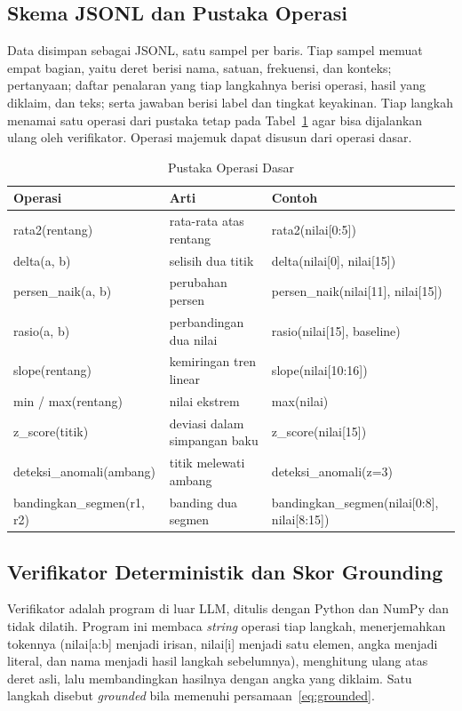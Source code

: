 \documentclass[10pt,a4paper,twocolumn]{article}
\begin{document}
\subsection{Skema JSONL dan Pustaka Operasi}
Data disimpan sebagai JSONL, satu sampel per baris. Tiap sampel memuat empat
bagian, yaitu deret berisi nama, satuan, frekuensi, dan konteks; pertanyaan;
daftar penalaran yang tiap langkahnya berisi operasi, hasil yang diklaim, dan
teks; serta jawaban berisi label dan tingkat keyakinan. Tiap langkah menamai
satu operasi dari pustaka tetap pada Tabel~\ref{tab:operasi} agar bisa
dijalankan ulang oleh verifikator. Operasi majemuk dapat disusun dari operasi
dasar.

\begin{table}[t]
\centering
\caption{Pustaka Operasi Dasar}
\label{tab:operasi}
\footnotesize
\begin{tabular}{@{}p{2.3cm}p{2.3cm}p{2.6cm}@{}}
\toprule
\textbf{Operasi} & \textbf{Arti} & \textbf{Contoh} \\
\midrule
rata2(rentang) & rata-rata atas rentang & rata2(nilai[0:5]) \\
delta(a, b) & selisih dua titik & delta(nilai[0], nilai[15]) \\
persen\_naik(a, b) & perubahan persen & persen\_naik(nilai[11], nilai[15]) \\
rasio(a, b) & perbandingan dua nilai & rasio(nilai[15], baseline) \\
slope(rentang) & kemiringan tren linear & slope(nilai[10:16]) \\
min / max(rentang) & nilai ekstrem & max(nilai) \\
z\_score(titik) & deviasi dalam simpangan baku & z\_score(nilai[15]) \\
deteksi\_anomali(ambang) & titik melewati ambang & deteksi\_anomali(z=3) \\
bandingkan\_segmen(r1, r2) & banding dua segmen & bandingkan\_segmen(nilai[0:8], nilai[8:15]) \\
\bottomrule
\end{tabular}
\end{table}

\subsection{Verifikator Deterministik dan Skor Grounding}
Verifikator adalah program di luar LLM, ditulis dengan Python dan NumPy dan
tidak dilatih. Program ini membaca \textit{string} operasi tiap langkah,
menerjemahkan tokennya (nilai[a:b] menjadi irisan, nilai[i] menjadi satu elemen,
angka menjadi literal, dan nama menjadi hasil langkah sebelumnya), menghitung
ulang atas deret asli, lalu membandingkan hasilnya dengan angka yang diklaim.
Satu langkah disebut \textit{grounded} bila memenuhi persamaan~\eqref{eq:grounded}.
\end{document}
